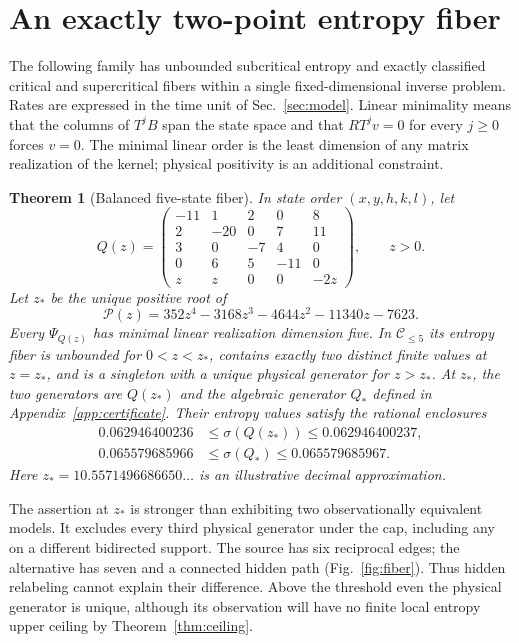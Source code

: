 \documentclass[aps,pre,onecolumn,11pt,longbibliography,notitlepage]{revtex4-2}
\newtheorem{theorem}{Theorem}
\newcommand{\1}{\mathbf 1}
\newcommand{\C}{\mathcal C}
\newcommand{\sig}{\sigma}
\newcommand{\zs}{z_*}
\begin{document}
\section{An exactly two-point entropy fiber}\label{sec:balanced}
The following family has unbounded subcritical entropy and exactly classified critical and supercritical fibers within a single fixed-dimensional inverse problem. Rates are expressed in the time unit of Sec.~\ref{sec:model}. Linear minimality means that the columns of $T^jB$ span the state space and that $RT^jv=0$ for every $j\ge0$ forces $v=0$. The minimal linear order is the least dimension of any matrix realization of the kernel; physical positivity is an additional constraint.
\begin{theorem}[Balanced five-state fiber]\label{thm:balanced}
In state order $(x,y,h,k,l)$, let
\begin{equation}
 Q(z)=\begin{pmatrix}
 -11&1&2&0&8\\2&-20&0&7&11\\3&0&-7&4&0\\
 0&6&5&-11&0\\z&z&0&0&-2z
 \end{pmatrix},\qquad z>0.\label{eq:theta}
\end{equation}
Let $\zs$ be the unique positive root of
\begin{equation}
 \mathcal P(z)=352z^4-3168z^3-4644z^2-11340z-7623.\label{eq:quartic}
\end{equation}
Every $\Psi_{Q(z)}$ has minimal linear realization dimension five. In $\C_{\le5}$ its entropy fiber is unbounded for $0<z<\zs$, contains exactly two distinct finite values at $z=\zs$, and is a singleton with a unique physical generator for $z>\zs$. At $\zs$, the two generators are $Q(\zs)$ and the algebraic generator $Q_*$ defined in Appendix~\ref{app:certificate}. Their entropy values satisfy the rational enclosures
\begin{align}
 0.062946400236&\le\sig(Q(\zs))\le0.062946400237,\label{eq:sig1}\\
 0.065579685966&\le\sig(Q_*)\le0.065579685967.\label{eq:sig2}
\end{align}
Here $\zs=10.5571496686650\ldots$ is an illustrative decimal approximation.
\end{theorem}

The assertion at $\zs$ is stronger than exhibiting two observationally equivalent models. It excludes every third physical generator under the cap, including any on a different bidirected support. The source has six reciprocal edges; the alternative has seven and a connected hidden path (Fig.~\ref{fig:fiber}). Thus hidden relabeling cannot explain their difference. Above the threshold even the physical generator is unique, although its observation will have no finite local entropy upper ceiling by Theorem~\ref{thm:ceiling}.
\end{document}
